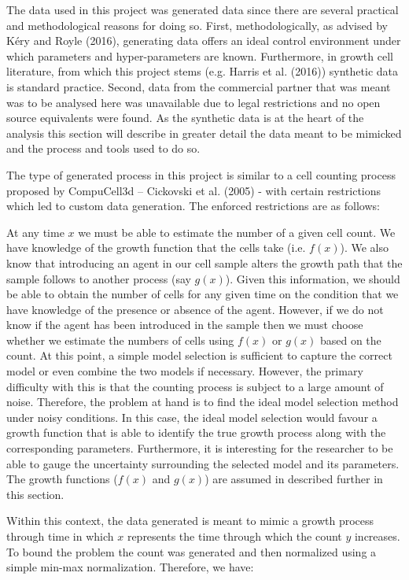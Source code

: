 \documentclass[]{article}
\begin{document}
The data used in this project was generated data since there are several
practical and methodological reasons for doing so. First,
methodologically, as advised by Kéry and Royle (2016), generating data
offers an ideal control environment under which parameters and
hyper-parameters are known. Furthermore, in growth cell literature, from
which this project stems (e.g. Harris et al. (2016)) synthetic data is
standard practice. Second, data from the commercial partner that was
meant was to be analysed here was unavailable due to legal restrictions
and no open source equivalents were found. As the synthetic data is at
the heart of the analysis this section will describe in greater detail
the data meant to be mimicked and the process and tools used to do so.

The type of generated process in this project is similar to a cell
counting process proposed by CompuCell3d -- Cickovski et al. (2005) -
with certain restrictions which led to custom data generation. The
enforced restrictions are as follows:

At any time \(x\) we must be able to estimate the number of a given cell
count. We have knowledge of the growth function that the cells take
(i.e. \(f(x)\)). We also know that introducing an agent in our cell
sample alters the growth path that the sample follows to another process
(say \(g(x)\)). Given this information, we should be able to obtain the
number of cells for any given time on the condition that we have
knowledge of the presence or absence of the agent. However, if we do not
know if the agent has been introduced in the sample then we must choose
whether we estimate the numbers of cells using \(f(x)\) or \(g(x)\)
based on the count. At this point, a simple model selection is
sufficient to capture the correct model or even combine the two models
if necessary. However, the primary difficulty with this is that the
counting process is subject to a large amount of noise. Therefore, the
problem at hand is to find the ideal model selection method under noisy
conditions. In this case, the ideal model selection would favour a
growth function that is able to identify the true growth process along
with the corresponding parameters. Furthermore, it is interesting for
the researcher to be able to gauge the uncertainty surrounding the
selected model and its parameters. The growth functions (\(f(x)\) and
\(g(x)\)) are assumed in described further in this section.

Within this context, the data generated is meant to mimic a growth
process through time in which \(x\) represents the time through which
the count \(y\) increases. To bound the problem the count was generated
and then normalized using a simple min-max normalization. Therefore, we
have:
\end{document}
